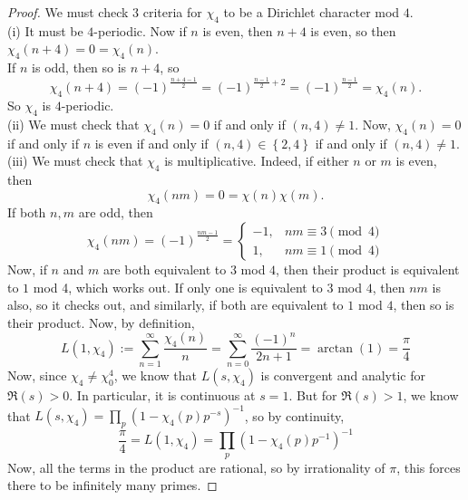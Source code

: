 \documentclass[reqno]{amsart}
\theoremstyle{definition}
\theoremstyle{remark}
\begin{document}
\begin{proof}
    We must check $3$ criteria for
    $\chi_4$ to be a Dirichlet character mod $4$.\\
    (i) It must be $4$-periodic. Now
    if $n$ is even, then
    $n+4$ is even, so then
    $\chi_4(n+4) = 0 = \chi_4 (n)$.\\
    If $n$ is odd, then so is $n+4$, so
    \[
    \chi_4(n+4) = 
    \left( -1 \right)^{\frac{n+4-1}{2}}
    = \left( -1 \right)^{\frac{n-1}{2} + 2}
    = \left( -1 \right)^{\frac{n-1}{2}}
    = \chi_4 (n).
    \] 
    So $\chi_4$ is $4$-periodic.\\
    (ii) We must check that
    $\chi_4(n) = 0$ if and only if
    $\left( n,4 \right) \neq 1$.
    Now, $\chi_4(n) = 0$ if and only if $n$ is even
    if and only if $\left( n,4 \right) \in 
    \left\{ 2,4 \right\} $ if and only if
    $\left( n,4 \right) \neq 1$.\\
    (iii) We must check that
    $\chi_4$ is multiplicative.
    Indeed, if either
    $n$ or $m$ is even, then
    \[
    \chi_4 (nm) = 0 = \chi(n) \chi(m).
    \] 
    If both $n,m$ are odd, then
    \[
    \chi_4 \left( nm \right) 
    = \left( -1 \right)^{\frac{nm-1}{2}}
    = 
    \begin{cases}
        -1,& nm \equiv 3 \pmod{4}\\
        1,& nm \equiv 1 \pmod{4}
    \end{cases}
    \] 
    Now, if $n$ and $m$ are both
    equivalent to $3$ mod $4$, then
    their product is equivalent to
    $1$ mod 4, which works out.
    If only one is equivalent to $3$ mod $4$, then
    $nm$ is also, so it checks out, and
    similarly, if both are equivalent to $1$ mod $4$, then
    so is their product.
    Now, by definition,
    \[
    L(1,\chi_4) :=
    \sum_{n=1}^{\infty} \frac{\chi_4(n)}{n}
    = \sum_{n=0}^{\infty} \frac{\left( -1 \right)^{n}}{2n+1}
    = \arctan(1)
    = \frac{\pi}{4}
    \] 
    Now,
    since  $\chi_4 \neq \chi_0^{4}$, 
    we know that
    $L\left( s, \chi_4 \right) $ is convergent and
    analytic for $\Re (s) > 0$. In particular, it is
    continuous at $s = 1$. But for
    $\Re(s) > 1$, we know that
    $L(s, \chi_4) = 
    \prod_p \left( 1 - \chi_4(p)p^{-s} \right)^{-1}$, so
    by continuity,
    \[
    \frac{\pi}{4} = L\left( 1,\chi_4 \right) 
    = \prod_p \left( 1- \chi_4(p) p^{-1} \right)^{-1}
    \] 
    Now, all the terms in the product are
    rational, so by irrationality of $\pi$, this
    forces there to be infinitely
    many primes.
\end{proof}
\end{document}

